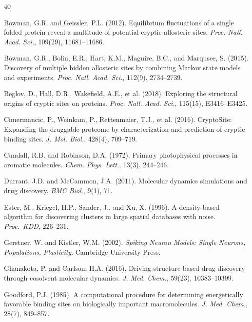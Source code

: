 \documentclass{sn-jnl}
\begin{document}
\begin{thebibliography}{40}

Bowman, G.R. and Geissler, P.L. (2012).
Equilibrium fluctuations of a single folded protein reveal a multitude of potential cryptic allosteric sites.
\textit{Proc. Natl. Acad. Sci.}, 109(29), 11681--11686.

Bowman, G.R., Bolin, E.R., Hart, K.M., Maguire, B.C., and Marqusee, S. (2015).
Discovery of multiple hidden allosteric sites by combining Markov state models and experiments.
\textit{Proc. Natl. Acad. Sci.}, 112(9), 2734--2739.

Beglov, D., Hall, D.R., Wakefield, A.E., et al. (2018).
Exploring the structural origins of cryptic sites on proteins.
\textit{Proc. Natl. Acad. Sci.}, 115(15), E3416--E3425.

Cimermancic, P., Weinkam, P., Rettenmaier, T.J., et al. (2016).
CryptoSite: Expanding the druggable proteome by characterization and prediction of cryptic binding sites.
\textit{J. Mol. Biol.}, 428(4), 709--719.

Cundall, R.B. and Robinson, D.A. (1972).
Primary photophysical processes in aromatic molecules.
\textit{Chem. Phys. Lett.}, 13(3), 244--246.

Durrant, J.D. and McCammon, J.A. (2011).
Molecular dynamics simulations and drug discovery.
\textit{BMC Biol.}, 9(1), 71.

Ester, M., Kriegel, H.P., Sander, J., and Xu, X. (1996).
A density-based algorithm for discovering clusters in large spatial databases with noise.
\textit{Proc.\ KDD}, 226--231.

Gerstner, W. and Kistler, W.M. (2002).
\textit{Spiking Neuron Models: Single Neurons, Populations, Plasticity}.
Cambridge University Press.

Ghanakota, P. and Carlson, H.A. (2016).
Driving structure-based drug discovery through cosolvent molecular dynamics.
\textit{J. Med. Chem.}, 59(23), 10383--10399.

Goodford, P.J. (1985).
A computational procedure for determining energetically favorable binding sites on biologically important macromolecules.
\textit{J. Med. Chem.}, 28(7), 849--857.


\end{thebibliography}
\end{document}
